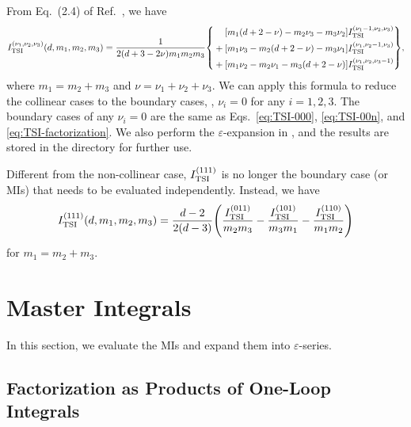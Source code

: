 \documentclass{article}
\begin{document}
            From Eq.~(2.4) of Ref.~\cite{Davydychev:2022dcw}, we have
            \begin{equation}
                \TSI{\nu_1, \nu_2, \nu_3}[d, m_1, m_2, m_3] = \frac{1}{2 \qty(d + 3 - 2 \nu) m_1 m_2 m_3} \qty{
                    \begin{aligned}
                        \qty[m_1 \qty(d + 2 - \nu) - m_2 \nu_3 - m_3 \nu_2] \TSI{\nu_1 - 1, \nu_2, \nu_3} \\
                        {} + \qty[m_1 \nu_3 - m_2 \qty(d + 2 - \nu) - m_3 \nu_1] \TSI{\nu_1, \nu_2 - 1, \nu_3} \\
                        {} + \qty[m_1 \nu_2 - m_2 \nu_1 - m_3 \qty(d + 2 - \nu)] \TSI{\nu_1, \nu_2, \nu_3 - 1} \\
                    \end{aligned}
                },
            \end{equation}
            where $m_1 = m_2 + m_3$ and $\nu = \nu_1 + \nu_2 + \nu_3$.
            We can apply this formula to reduce the collinear cases to the boundary cases, \ie, $\nu_i = 0$ for any $i = 1, 2, 3$.
            The boundary cases of any $\nu_i = 0$ are the same as Eqs.~\eqref{eq:TSI-000}, \eqref{eq:TSI-00n}, and \eqref{eq:TSI-factorization}.
            We also perform the $\varepsilon$-expansion in , and the results are stored in the directory  for further use.
            
            Different from the non-collinear case, $\TSI{111}$ is no longer the boundary case (or MIs) that needs to be evaluated independently.
            Instead, we have \cite[Eq.~(2.14)]{Davydychev:2022dcw}
            \begin{equation}
                \TSI{111}[d, m_1, m_2, m_3] = \frac{d - 2}{2 (d - 3)} \qty(\frac{\TSI{011}}{m_2 m_3} - \frac{\TSI{101}}{m_3 m_1} - \frac{\TSI{110}}{m_1 m_2})
            \end{equation}
            for $m_1 = m_2 + m_3$.

    \section{Master Integrals}\label{sec:master-integral}
            
        In this section, we evaluate the MIs and expand them into $\varepsilon$-series.

        \subsection{Factorization as Products of One-Loop Integrals}
\end{document}

